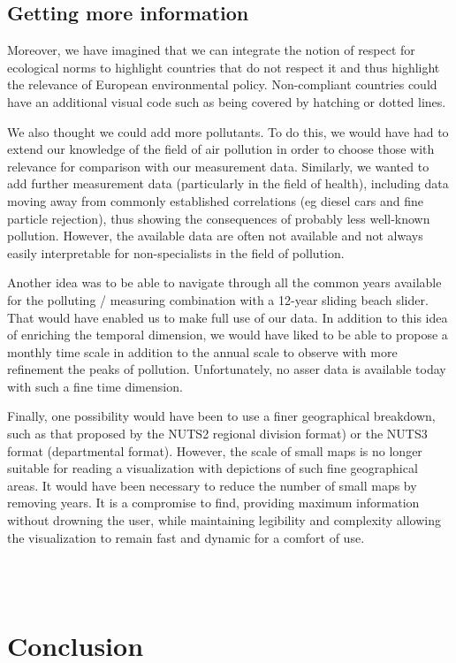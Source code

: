 \documentclass[preprint,journal]{vgtc}       %
\begin{document}
\subsection{Getting more information}
Moreover, we have imagined that we can integrate the notion of respect for ecological norms to highlight countries that do not respect it and thus highlight the relevance of European environmental policy. Non-compliant countries could have an additional visual code such as being covered by hatching or dotted lines.

We also thought we could add more pollutants. To do this, we would have had to extend our knowledge of the field of air pollution in order to choose those with relevance for comparison with our measurement data. Similarly, we wanted to add further measurement data (particularly in the field of health), including data moving away from commonly established correlations (eg diesel cars and fine particle rejection), thus showing the consequences of probably less well-known pollution. However, the available data are often not available and not always easily interpretable for non-specialists in the field of pollution.
		
Another idea was to be able to navigate through all the common years available for the polluting / measuring combination with a 12-year sliding beach slider. That would have enabled us to make full use of our data. In addition to this idea of ​​enriching the temporal dimension, we would have liked to be able to propose a monthly time scale in addition to the annual scale to observe with more refinement the peaks of pollution. Unfortunately, no asser data is available today with such a fine time dimension.

Finally, one possibility would have been to use a finer geographical breakdown, such as that proposed by the NUTS2 regional division format) or the NUTS3 format (departmental format). However, the scale of small maps is no longer suitable for reading a visualization with depictions of such fine geographical areas. It would have been necessary to reduce the number of small maps by removing years. It is a compromise to find, providing maximum information without drowning the user, while maintaining legibility and complexity allowing the visualization to remain fast and dynamic for a comfort of use.

~\\
~\\

\section{Conclusion}
\end{document}
